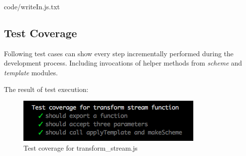 
{code/writeIn.js.txt}

\subsection{Test Coverage}
Following test cases can show every step incrementally performed during the development process. Including invocations of helper methods from \textit{scheme} and \textit{template} modules.
%

The result of test execution:
\begin{figure}[H]
	\centering
	\includegraphics[width=\linewidth]{grafiken/testTransform.png}
	\caption{Test coverage for transform\_stream.js}
	\label{fig:testTransofm}
\end{figure}

